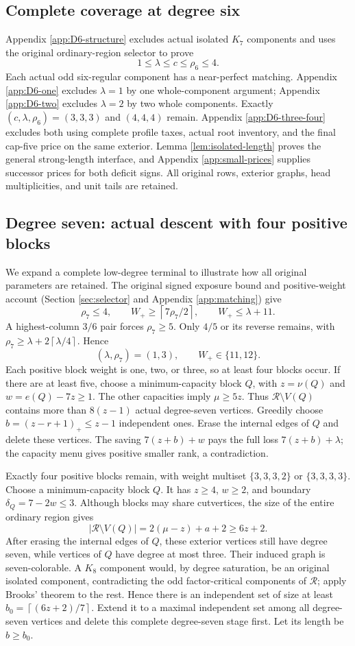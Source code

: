\documentclass[11pt,a4paper]{article}
\newcommand{\ceil}[1]{\left\lceil#1\right\rceil}
\theoremstyle{definition}
\begin{document}
\subsection{Complete coverage at degree six}
Appendix \ref{app:D6-structure} excludes actual isolated $K_7$ components and uses the original ordinary-region selector to prove
\[
 1\le\lambda\le c\le\rho_6\le4.
\]
Each actual odd six-regular component has a near-perfect matching. Appendix \ref{app:D6-one} excludes $\lambda=1$ by one whole-component argument; Appendix \ref{app:D6-two} excludes $\lambda=2$ by two whole components. Exactly $(c,\lambda,\rho_6)=(3,3,3)$ and $(4,4,4)$ remain. Appendix \ref{app:D6-three-four} excludes both using complete profile taxes, actual root inventory, and the final cap-five price on the same exterior. Lemma \ref{lem:isolated-length} proves the general strong-length interface, and Appendix \ref{app:small-prices} supplies successor prices for both deficit signs. All original rows, exterior graphs, head multiplicities, and unit tails are retained.

\subsection{Degree seven: actual descent with four positive blocks}
We expand a complete low-degree terminal to illustrate how all original parameters are retained.
The original signed exposure bound and positive-weight account (Section \ref{sec:selector} and Appendix \ref{app:matching}) give
\[
\rho_7\le4,\qquad
W_+\ge\ceil{7\rho_7/2},\qquad W_+\le\lambda+11.
\]
A highest-column $3/6$ pair forces $\rho_7\ge5$. Only $4/5$ or its reverse remains, with
$\rho_7\ge\lambda+2\ceil{\lambda/4}$. Hence
\[
(\lambda,\rho_7)=(1,3),\qquad W_+\in\{11,12\}.
\]
Each positive block weight is one, two, or three, so at least four blocks occur. If there are at least five, choose a minimum-capacity block $Q$, with $z=\nu(Q)$ and $w=e(Q)-7z\ge1$. The other capacities imply $\mu\ge5z$. Thus $\mathcal R\setminus V(Q)$ contains more than $8(z-1)$ actual degree-seven vertices. Greedily choose $b=(z-r+1)_+\le z-1$ independent ones. Erase the internal edges of $Q$ and delete these vertices. The saving $7(z+b)+w$ pays the full loss $7(z+b)+\lambda$; the capacity menu gives positive smaller rank, a contradiction.

Exactly four positive blocks remain, with weight multiset
$\{3,3,3,2\}$ or $\{3,3,3,3\}$. Choose a minimum-capacity block $Q$. It has $z\ge4$, $w\ge2$, and boundary $\delta_Q=7-2w\le3$. Although blocks may share cutvertices, the size of the entire ordinary region gives
\[
|\mathcal R\setminus V(Q)|=2(\mu-z)+a+2\ge6z+2.
\]
After erasing the internal edges of $Q$, these exterior vertices still have degree seven, while vertices of $Q$ have degree at most three. Their induced graph is seven-colorable. A $K_8$ component would, by degree saturation, be an original isolated component, contradicting the odd factor-critical components of $\mathcal R$; apply Brooks' theorem to the rest. Hence there is an independent set of size at least $b_0=\ceil{(6z+2)/7}$. Extend it to a maximal independent set among all degree-seven vertices and delete this complete degree-seven stage first. Let its length be $b\ge b_0$.
\end{document}
